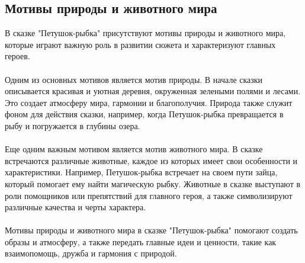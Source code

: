 \documentclass{article}
\begin{document}
\subsection{Мотивы природы и животного мира}
В сказке "{}{}Петушок-рыбка"{}{} присутствуют мотивы природы и животного мира, которые играют важную роль в развитии сюжета и характеризуют главных героев.\\
~\\
Одним из основных мотивов является мотив природы. В начале сказки описывается красивая и уютная деревня, окруженная зелеными полями и лесами. Это создает атмосферу мира, гармонии и благополучия. Природа также служит фоном для действия сказки, например, когда Петушок-рыбка превращается в рыбу и погружается в глубины озера.\\
~\\
Еще одним важным мотивом является мотив животного мира. В сказке встречаются различные животные, каждое из которых имеет свои особенности и характеристики. Например, Петушок-рыбка встречает на своем пути зайца, который помогает ему найти магическую рыбку. Животные в сказке выступают в роли помощников или препятствий для главного героя, а также символизируют различные качества и черты характера.\\
~\\
Мотивы природы и животного мира в сказке "{}{}Петушок-рыбка"{}{} помогают создать образы и атмосферу, а также передать главные идеи и ценности, такие как взаимопомощь, дружба и гармония с природой.
\end{document}
